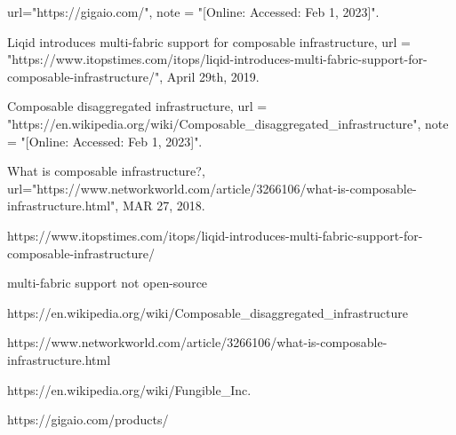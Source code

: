   url="https://gigaio.com/",
  note = "[Online: Accessed: Feb 1, 2023]". 
  
  Liqid introduces multi-fabric support for composable infrastructure,
  url = "https://www.itopstimes.com/itops/liqid-introduces-multi-fabric-support-for-composable-infrastructure/",
  April 29th, 2019.
  
  Composable disaggregated infrastructure,
  url = "https://en.wikipedia.org/wiki/Composable_disaggregated_infrastructure",
  note = "[Online: Accessed: Feb 1, 2023]".

  What is composable infrastructure?,
  url="https://www.networkworld.com/article/3266106/what-is-composable-infrastructure.html",
  MAR 27, 2018.


https://www.itopstimes.com/itops/liqid-introduces-multi-fabric-support-for-composable-infrastructure/

multi-fabric support not open-source

https://en.wikipedia.org/wiki/Composable_disaggregated_infrastructure

https://www.networkworld.com/article/3266106/what-is-composable-infrastructure.html

https://en.wikipedia.org/wiki/Fungible_Inc.

https://gigaio.com/products/





 

